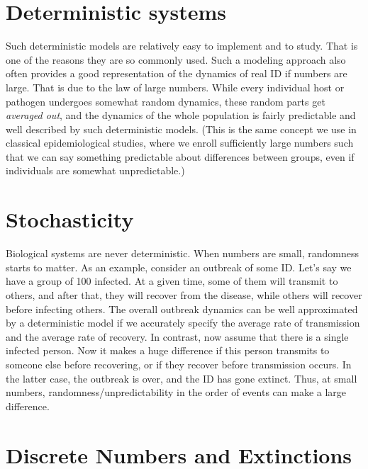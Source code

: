 \documentclass[
]{book}
\begin{document}
\hypertarget{deterministic-systems}{%
\section{Deterministic systems}\label{deterministic-systems}}

Such deterministic models are relatively easy to implement and to study. That is one of the reasons they are so commonly used. Such a modeling approach also often provides a good representation of the dynamics of real ID if numbers are large. That is due to the law of large numbers. While every individual host or pathogen undergoes somewhat random dynamics, these random parts get \emph{averaged out}, and the dynamics of the whole population is fairly predictable and well described by such deterministic models. (This is the same concept we use in classical epidemiological studies, where we enroll sufficiently large numbers such that we can say something predictable about differences between groups, even if individuals are somewhat unpredictable.)

\hypertarget{stochasticity}{%
\section{Stochasticity}\label{stochasticity}}

Biological systems are never deterministic. When numbers are small, randomness starts to matter. As an example, consider an outbreak of some ID. Let's say we have a group of 100 infected. At a given time, some of them will transmit to others, and after that, they will recover from the disease, while others will recover before infecting others. The overall outbreak dynamics can be well approximated by a deterministic model if we accurately specify the average rate of transmission and the average rate of recovery. In contrast, now assume that there is a single infected person. Now it makes a huge difference if this person transmits to someone else before recovering, or if they recover before transmission occurs. In the latter case, the outbreak is over, and the ID has gone extinct. Thus, at small numbers, randomness/unpredictability in the order of events can make a large difference.

\hypertarget{discrete-numbers-and-extinctions}{%
\section{Discrete Numbers and Extinctions}\label{discrete-numbers-and-extinctions}}
\end{document}
